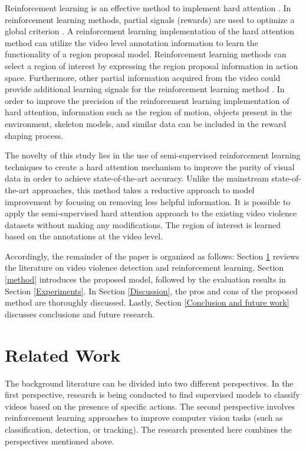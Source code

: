 \documentclass[review]{elsarticle}
\begin{document}
Reinforcement learning is an effective method to implement hard attention \citep{rao2017attention, driessens2019focused, shen2018reinforced, mott2019towards}. In reinforcement learning methods, partial signals (rewards) are used to optimize a global criterion \citep{sutton2018reinforcement}. A reinforcement learning implementation of the hard attention method can utilize the video level annotation information to learn the functionality of a region proposal model. Reinforcement learning methods can select a region of interest by expressing the region proposal information in action space. Furthermore, other partial information acquired from the video could provide additional learning signals for the reinforcement learning method \citep{sutton2018reinforcement}. In order to improve the precision of the reinforcement learning implementation of hard attention, information such as the region of motion, objects present in the environment, skeleton models, and similar data can be included in the reward shaping process.

{The novelty of this study lies in the use of semi-supervised reinforcement learning techniques to create a hard attention mechanism to improve the purity of visual data in order to achieve state-of-the-art accuracy. Unlike the mainstream state-of-the-art approaches, this method takes a reductive approach to model improvement by focusing on removing less helpful information. It is possible to apply the semi-supervised hard attention approach to the existing video violence datasets without making any modifications. The region of interest is learned based on the annotations at the video level.}

Accordingly, the remainder of the paper is organized as follows: Section \ref{Related Work} reviews the literature on video violence detection and reinforcement learning. Section \ref{method} introduces the proposed model, followed by the evaluation results in Section \ref{Experiments}. In Section \ref{Discussion}, the pros and cons of the proposed method are thoroughly discussed. Lastly, Section \ref{Conclusion and future work} discusses conclusions and future research.


\section{Related Work}
\label{Related Work}


{The background literature can be divided into two different perspectives. In the first perspective, research is being conducted to find supervised models to classify videos based on the presence of specific actions. The second perspective involves reinforcement learning approaches to improve computer vision tasks (such as classification, detection, or tracking). The research presented here combines the perspectives mentioned above.}
\end{document}
